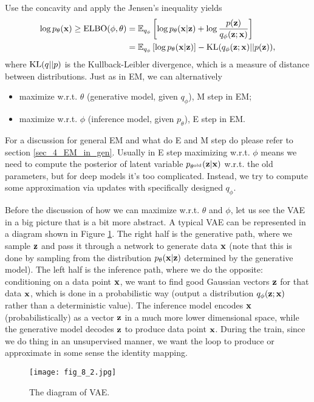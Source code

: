 \documentclass[../main.tex]{subfiles}
\begin{document}
Use the concavity and apply the Jensen's inequality yields
\begin{align*}
\log p_{\theta}({\bf x})\geq {\rm ELBO}(\phi, \theta)&=\mathbb{E}_{q_{\phi}}\left[\log p_{\theta}({\bf x}|{\bf z}) + \log \frac{p({\bf z})}{q_{\phi}({\bf z};{\bf x})} \right]\\
&=\mathbb{E}_{q_{\phi}}\left[\log p_{\theta}({\bf x}|{\bf z})\right] - {\rm KL}(q_{\phi}({\bf z};{\bf x})||p({\bf z})),
\end{align*}
where ${\rm KL}(q||p)$ is the Kullback-Leibler divergence, which is a measure of distance between distributions. Just as in EM, we can alternatively
\begin{itemize}
	\item maximize w.r.t. $\theta$ (generative model, given $q_{\phi}$), M step in EM;
	\item maximize w.r.t. $\phi$ (inference model, given $p_\theta$), E step in EM. 
\end{itemize}
For a discussion for general EM and what do E and M step do please refer to section \ref{sec_4_EM_in_gen}. Usually in E step maximizing  w.r.t. $\phi$ means we need to compute the posterior of latent variable $p_{\theta^{\rm old}}({\bf z}|{\bf x})$ w.r.t. the old parameters, but for deep models it's too complicated. Instead, we try to compute some approximation via updates with specifically designed $q_{\phi}$.
\par Before the discussion of how we can maximize w.r.t. $\theta$ and $\phi$, let us see the VAE in a big picture that is a bit more abstract. A typical VAE can be represented in a diagram shown in Figure \ref{fig_8_2}. The right half is the generative path, where we sample ${\bf z}$ and pass it through a network to generate data ${\bf x}$ (note that this is done by sampling from the distribution $p_\theta({\bf x}|{\bf z})$ determined by the generative model). The left half is the inference path, where we do the opposite: conditioning on a data point ${\bf x}$, we want to find good Gaussian vectors ${\bf z}$ for that data ${\bf x}$, which is done in a probabilistic way (output a distribution $q_{\phi}({\bf z};{\bf x})$ rather than a deterministic value). The inference model encodes ${\bf x}$ (probabilistically) as a vector ${\bf z}$ in a much more lower dimensional space, while the generative model decodes ${\bf z}$ to produce data point ${\bf x}$. During the train, since we do thing in an unsupervised manner, we want the loop to produce or approximate in some sense the identity mapping.
\begin{figure}[h] 
	\centering 
	\texttt{[image: fig\_8\_2.jpg]} 
	\caption{The diagram of VAE.}\label{fig_8_2}
\end{figure}
\end{document}
